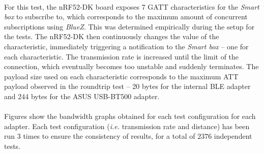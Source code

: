 \paragraph{} For this test, the nRF52-DK board exposes 7 \acs{GATT} characteristics for the \textit{Smart box} to subscribe to, which corresponds to the maximum amount of concurrent subscriptions using \textit{BlueZ}. This was determined empirically during the setup for the tests. The nRF52-DK then continuously changes the value of the characteristic, immediately triggering a notification to the \textit{Smart box} -- one for each characteristic. The transmission rate is increased until the limit of the connection, which eventually becomes too unstable and suddenly terminates. The payload size used on each characteristic corresponds to the maximum \acs{ATT} payload observed in the roundtrip test -- 20 bytes for the internal \acs{BLE} adapter and 244 bytes for the ASUS USB-BT500 adapter.

\paragraph{} Figures  show the bandwidth graphs obtained for each test configuration for each adapter. Each test configuration (\textit{i.e.} transmission rate and distance) has been run 3 times to ensure the consistency of results, for a total of $2376$ independent tests. 


